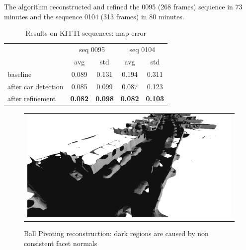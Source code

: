 The algorithm reconstructed and refined the 0095 (268 frames) sequence in 73 minutes and the sequence 0104 (313 frames) in 80 minutes.


\begin{table}[t]
\caption{Results on KITTI sequences: map error}
\label{tab:res}
\centering
\setlength{\tabcolsep}{3px}
\begin{tabular}{lcccc}
\toprule           
&\multicolumn{2}{c}{seq 0095}&\multicolumn{2}{c}{seq 0104}\\
&avg & std  &avg & std \\
\midrule
baseline & 0.089&0.131 & 0.194 & 0.311\\
after car detection  & 0.085&0.099 & 0.087 & 0.123\\
after refinement  & \textbf{0.082}&\textbf{0.098} &  \textbf{0.082}&\textbf{0.103} \\
\end{tabular}
\end{table}




\begin{figure}[tp]
 \centering
\setlength{\tabcolsep}{2px}
    \begin{tabular}{c}
    \includegraphics[width=0.98\columnwidth]{./img/ch-laser/ball00}\\
    \end{tabular}
 \caption{Ball Pivoting reconstruction: dark regions are caused by non consistent facet normals}
 \label{fig:ball}
\end{figure}

